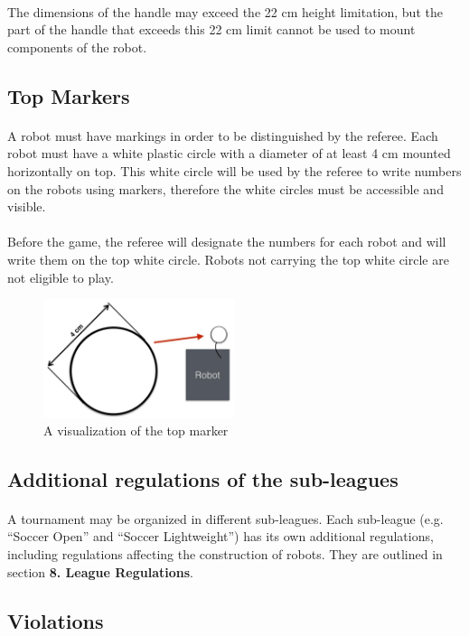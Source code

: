 \documentclass{article}
\newcommand*{\p}{\paragraph{}}
\begin{document}
\p The dimensions of the handle may exceed the 22 cm height limitation, but the
part of the handle that exceeds this 22 cm limit cannot be used to mount
components of the robot.

\subsection{ Top Markers\label{ref-top-markers}}

\p A robot must have markings in order to be distinguished by the referee. Each
robot must have a white plastic circle with a diameter of at least 4 cm mounted
horizontally on top. This white circle will be used by the referee to write
numbers on the robots using markers, therefore the white circles must be
accessible and visible.

\p Before the game, the referee will designate the numbers for each robot and will
write them on the top white circle. Robots not carrying the top white circle
are not eligible to play.

\begin{figure}[H]
    \centering
    \includegraphics[width=0.5\textwidth]{media/image4.jpeg}
    \caption{A visualization of the top marker}
    \label{fig:top_marker}
\end{figure}

\subsection{ Additional regulations of the sub-leagues \label{ref-sub-leagues}}

\p A tournament may be organized in different sub-leagues. Each sub-league (e.g.
``Soccer Open'' and ``Soccer Lightweight'') has its own additional regulations,
including regulations affecting the construction of robots. They are outlined
in section \textbf{8. League Regulations}.

\subsection{ Violations \label{ref-027}}
\end{document}
